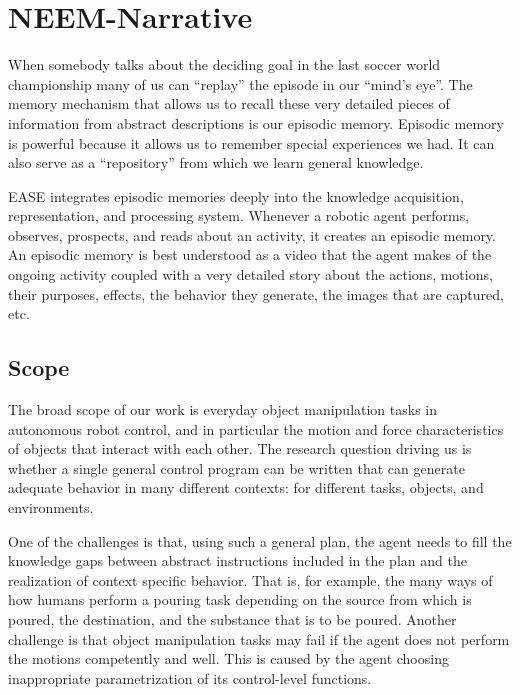 
\section{NEEM-Narrative}
\label{ch:narrative}

When somebody talks about the deciding goal in the
last soccer world championship many of us can ``replay'' the episode
in our ``mind's eye''. %
The memory
mechanism that allows us to recall these very detailed pieces of
information from abstract descriptions is our episodic memory.
Episodic memory is powerful because it allows us to remember special
experiences we had. It can also serve as a ``repository'' from which
we learn general knowledge.

EASE integrates episodic memories
deeply into the knowledge acquisition, representation, and processing
system. Whenever a robotic agent performs, observes, prospects, and
reads about an activity, it creates an episodic memory. An episodic
memory is best understood as a video that the agent makes of the
ongoing activity 
coupled with a very
detailed story about the actions, motions, their purposes, effects,
the behavior they generate, the images that are captured, etc.

\subsection{Scope} %
\label{sec:narrative:scope}

The broad scope of our work is everyday object manipulation tasks in autonomous robot control, and in particular the motion and force characteristics of objects that interact with each other.
The research question driving us is whether a single general control program can be written that can generate adequate behavior in many different contexts: for different tasks, objects, and environments.

One of the challenges is that, using such a general plan, the agent needs to fill the knowledge gaps between abstract instructions included in the plan and the realization of context specific behavior. That is, for example, the many ways of how humans perform a pouring task depending on the source from which is poured, the destination, and the substance that is to be poured.
Another challenge is that object manipulation tasks may fail if the agent does not perform the motions competently and well. This is caused by the agent choosing inappropriate parametrization of its control-level functions.

